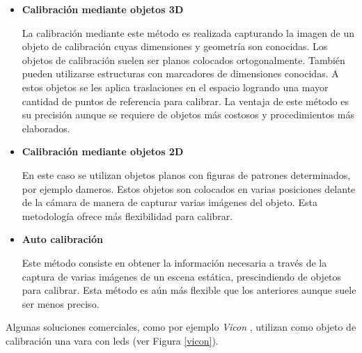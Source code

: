 \begin{itemize}
\item \textbf{Calibración mediante objetos 3D}


La calibración mediante este método es realizada capturando la imagen de un objeto de calibración cuyas dimensiones y geometría son conocidas. Los objetos de calibración suelen ser planos colocados ortogonalmente. También pueden utilizarse estructuras con marcadores de dimensiones conocidas. A estos objetos se les aplica traslaciones en el espacio logrando una mayor cantidad de puntos de referencia para calibrar. La ventaja de este método es su precisión aunque se requiere de objetos más costosos y procedimientos más elaborados.

\item \textbf{Calibración mediante objetos 2D}


En este caso se utilizan objetos planos con figuras de patrones determinados, por ejemplo dameros. Estos objetos son colocados en varias posiciones delante de la cámara de manera de capturar varias imágenes del objeto. Esta metodología ofrece más flexibilidad para calibrar.

\item \textbf{Auto calibración}


Este método consiste en obtener la información necesaria a través de la captura de varias imágenes de un escena estática, prescindiendo de objetos para calibrar. Esta método es aún más flexible que los anteriores aunque suele ser menos preciso.

\end{itemize}


Algunas soluciones comerciales, como por ejemplo \emph{Vicon} \cite{vicon}, utilizan como objeto de calibración una vara con leds (ver Figura \ref{vicon}). 

